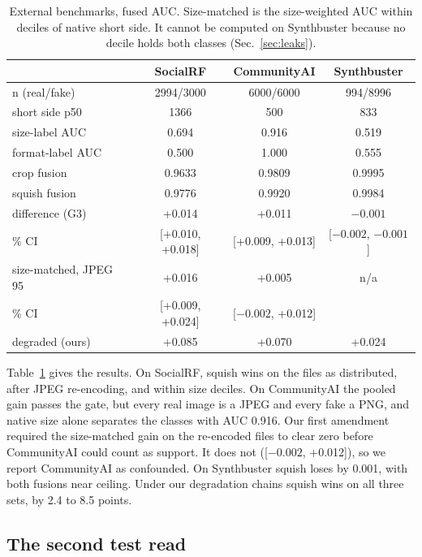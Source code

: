 \documentclass[10pt,twocolumn,letterpaper]{article}
\begin{document}
\begin{table}[t]
\centering
\small
\setlength{\tabcolsep}{3pt}
\begin{tabular}{lccc}
\toprule
 & SocialRF & CommunityAI & Synthbuster \\
\midrule
n (real/fake) & 2994/3000 & 6000/6000 & 994/8996 \\
short side p50 & 1366 & 500 & 833 \\
size-label AUC & 0.694 & 0.916 & 0.519 \\
format-label AUC & 0.500 & 1.000 & 0.555 \\
\midrule
crop fusion & 0.9633 & 0.9809 & 0.9995 \\
squish fusion & 0.9776 & 0.9920 & 0.9984 \\
difference (G3) & +0.014 & +0.011 & $-0.001$ \\
\quad 95\% CI & [+0.010, +0.018] & [+0.009, +0.013] & [$-0.002$, $-0.001$] \\
\midrule
size-matched, JPEG 95 & +0.016 & +0.005 & n/a \\
\quad 95\% CI & [+0.009, +0.024] & [$-0.002$, +0.012] & \\
degraded (ours) & +0.085 & +0.070 & +0.024 \\
\bottomrule
\end{tabular}
\caption{External benchmarks, fused AUC. Size-matched is the size-weighted AUC
within deciles of native short side. It cannot be computed on Synthbuster
because no decile holds both classes (Sec.~\ref{sec:leaks}).}
\label{tab:external}
\end{table}

Table~\ref{tab:external} gives the results. On SocialRF, squish wins on the
files as distributed, after JPEG re-encoding, and within size deciles. On
CommunityAI the pooled gain passes the gate, but every real image is a JPEG
and every fake a PNG, and native size alone separates the classes with AUC
0.916. Our first amendment required the size-matched gain on the re-encoded
files to clear zero before CommunityAI could count as support. It does not
([$-0.002$, +0.012]), so we report CommunityAI as confounded. On Synthbuster
squish loses by 0.001, with both fusions near ceiling. Under our degradation
chains squish wins on all three sets, by 2.4 to 8.5 points.

\subsection{The second test read}
\end{document}
